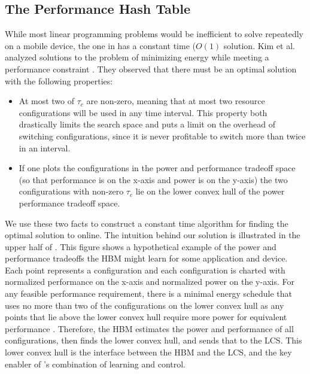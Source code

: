\subsection{The Performance Hash Table}
While most linear programming problems would be inefficient to solve
repeatedly on a mobile device, the one in  has a
constant time ($O(1)$ solution.  Kim et al. analyzed solutions to the
problem of minimizing energy while meeting a performance constraint
\cite{kim-cpsna}.  They observed that there must be an optimal
solution with the following properties:
\begin{itemize}
\item At most two of $\tau_c$ are non-zero, meaning that at most two
  resource configurations will be used in any time interval.  This
  property both drastically limits the search space and puts a limit
  on the overhead of switching configurations, since it is never
  profitable to switch more than twice in an interval.
\item If one plots the configurations in the power and performance
  tradeoff space (so that performance is on the x-axis and power is on
  the y-axis) the two configurations with non-zero $\tau_c$ lie on the
  lower convex hull of the power performance tradeoff space.
\end{itemize}
We use these two facts to construct a constant time algorithm for
finding the optimal solution to  online.  The
intuition behind our solution is illustrated in the upper half of
.  This figure shows a hypothetical example of the power
and performance tradeoffs the HBM might learn for some application and
device.  Each point represents a configuration and each configuration
is charted with normalized performance on the x-axis and normalized
power on the y-axis.  For any feasible performance requirement, there
is a minimal energy schedule that uses no more than two of the
configurations on the lower convex hull as any points that lie above
the lower convex hull require more power for equivalent performance
\cite{kim-cpsna}.  Therefore, the HBM estimates the power and
performance of all configurations, then finds the lower convex hull,
and sends that to the LCS.  This lower convex hull is the interface
between the HBM and the LCS, and the key enabler of \SYSTEM{}'s
combination of learning and control.





